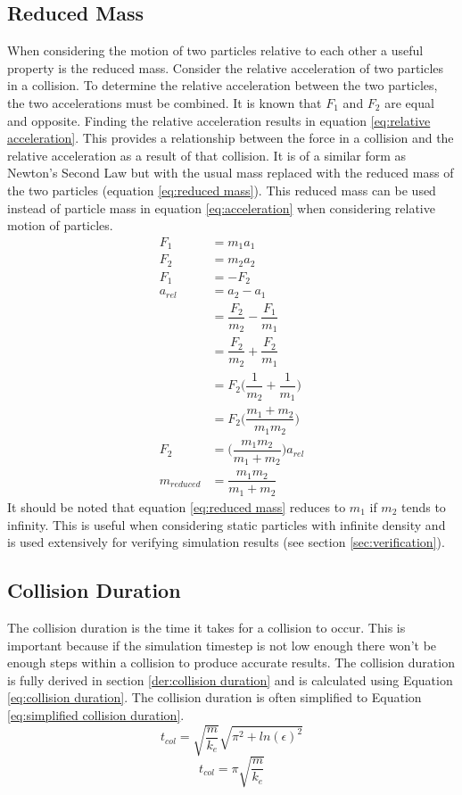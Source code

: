 \documentclass[10pt,a4paper,titlepage]{report}
\begin{document}
\subsection{Reduced Mass}
When considering the motion of two particles relative to each other a useful property is the reduced mass. Consider the relative acceleration of two particles in a collision. To determine the relative acceleration between the two particles, the two accelerations must be combined. It is known that $F_1$ and $F_2$ are equal and opposite. Finding the relative acceleration results in equation \ref{eq:relative acceleration}. This provides a relationship between the force in a collision and the relative acceleration as a result of that collision. It is of a similar form as Newton's Second Law but with the usual mass replaced with the reduced mass of the two particles (equation \ref{eq:reduced mass}). This reduced mass can be used instead of particle mass in equation \ref{eq:acceleration} when considering relative motion of particles.
\begin{align}
F_1 &= m_1 a_1 \nonumber
\\F_2 &= m_2 a_2 \nonumber
\\F_1 &= -F_2 \nonumber
\\a_{rel} &= a_2 - a_1 \nonumber
\\&= \dfrac{F_2}{m_2} - \dfrac{F_1}{m_1} \nonumber
\\&= \dfrac{F_2}{m_2} + \dfrac{F_2}{m_1} \nonumber
\\&= F_2 \Big(\dfrac{1}{m_2} + \dfrac{1}{m_1}\Big) \nonumber
\\&= F_2 \Big(\dfrac{m_1 + m_2}{m_1 m_2}\Big) \nonumber
\\F_2 &= \Big(\dfrac{m_1 m_2}{m_1 + m_2}\Big) a_{rel} \label{eq:relative acceleration}
\\m_{reduced} &= \dfrac{m_1 m_2}{m_1 + m_2} \label{eq:reduced mass}
\end{align}
It should be noted that equation \ref{eq:reduced mass} reduces to $m_1$ if $m_2$ tends to infinity. This is useful when considering static particles with infinite density and is used extensively for verifying simulation results (see section \ref{sec:verification}).
\subsection{Collision Duration}
\label{sec:collision duration}
The collision duration is the time it takes for a collision to occur. This is important because if the simulation timestep is not low enough there won't be enough steps within a collision to produce accurate results. The collision duration is fully derived in section \ref{der:collision duration} and is calculated using Equation \ref{eq:collision duration}. The collision duration is often simplified to Equation \ref{eq:simplified collision duration}.
\begin{equation}
t_{col} = \sqrt{\dfrac{m}{k_e}}\sqrt{\pi^2 + ln(\epsilon)^2}
\label{eq:collision duration}
\end{equation}
\begin{equation}
t_{col} = \pi \sqrt{\dfrac{m}{k_e}}
\label{eq:simplified collision duration}
\end{equation}
\end{document}
